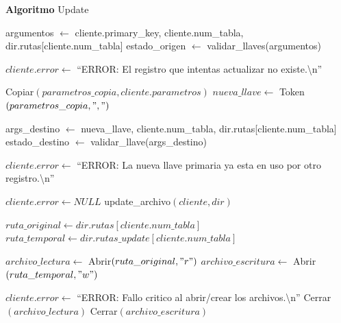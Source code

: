 \begin{tcolorbox}[colback=white, colframe=azul_unam, 
title=Pseudocódigo: update.c, breakable]

\textbf{Algoritmo} Update

\begin{algorithmic}[1]



\State argumentos $\gets$ cliente.primary\_key, cliente.num\_tabla, dir.rutas[cliente.num\_tabla]
\State estado\_origen $\gets$ validar\_llaves(argumentos)

    \State $cliente.error \gets$ ``ERROR: El registro que intentas actualizar no existe.\textbackslash n''
    \State \Return
\EndIf

\State Copiar$(parametros\_copia, cliente.parametros)$
\State $nueva\_llave \gets$ Token$(parametros\_copia, ",")$


    \State args\_destino $\gets$ nueva\_llave, cliente.num\_tabla, dir.rutas[cliente.num\_tabla]
    \State estado\_destino $\gets$ validar\_llave(args\_destino)

        \State $cliente.error \gets$ ``ERROR: La nueva llave primaria ya esta en uso por otro registro.\textbackslash n''
        \State \Return
    \EndIf

\EndIf

\State $cliente.error \gets NULL$
\State update\_archivo$(cliente, dir)$

\EndProcedure

\vspace{0.3cm}



\State $ruta\_original \gets dir.rutas[cliente.num\_tabla]$
\State $ruta\_temporal \gets dir.rutas\_update[cliente.num\_tabla]$

\State $archivo\_lectura \gets$ Abrir$(ruta\_original, "r")$
\State $archivo\_escritura \gets$ Abrir$(ruta\_temporal, "w")$

    \State $cliente.error \gets$ ``ERROR: Fallo critico al abrir/crear los archivos.\textbackslash n''
        \State Cerrar$(archivo\_lectura)$
    \EndIf
        \State Cerrar$(archivo\_escritura)$
    \EndIf
    \State \Return
\EndIf


\end{algorithmic}
\end{tcolorbox}
